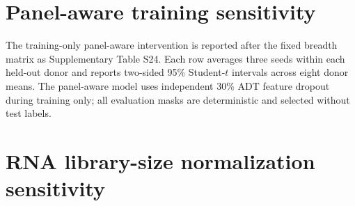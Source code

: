 \documentclass[10pt]{article}
\begin{document}
\begin{table}[H]
\centering
\caption{Protocol-stratified secondary breadth matrix. Methods are rows and dataset--metric pairs are grouped by dataset. Each block reports ACC, W-F1, M-F1, aggregation and $n$ seeds/artifacts; ``single model'' denotes one prediction artifact, ``seed mean'' an arithmetic mean across the listed model seeds, and ``majority ensemble'' a fixed vote across the listed prediction files. The PBMC strict L3, COVID-19 full and GSE164378 exact-L3 blocks retain their source protocols. MOSAIC GSE164378 is a fixed three-seed majority ensemble; the table is descriptive and is not evidence for a universal ranking. All 63 metric cells and their aggregation metadata are covered by source metadata in \texttt{results/tables/v30\_main\_wide\_performance\_table\_ci\_sources\_2026-07-23.csv}.}
\label{tab:cross-dataset-breadth}
\scriptsize
\setlength{\tabcolsep}{2.8pt}
\resizebox{\textwidth}{!}{%

}
\end{table}

\section{Panel-aware training sensitivity}

The training-only panel-aware intervention is reported after the fixed breadth matrix as Supplementary Table S24. Each row averages three seeds within each held-out donor and reports two-sided 95\% Student-$t$ intervals across eight donor means. The panel-aware model uses independent 30\% ADT feature dropout during training only; all evaluation masks are deterministic and selected without test labels.

\begin{table}[H]
\centering
\caption{Training-only panel-aware sensitivity. The panel-aware model uses independent 30\% ADT feature dropout during training only. Frozen-checkpoint rows are the reference from the deterministic mask audit; evaluation scenarios are applied after training.}
\label{tab:panel-aware-training}
\scriptsize
\setlength{\tabcolsep}{2.2pt}
\resizebox{\textwidth}{!}{%

}
\end{table}

\section{RNA library-size normalization sensitivity}
\end{document}

